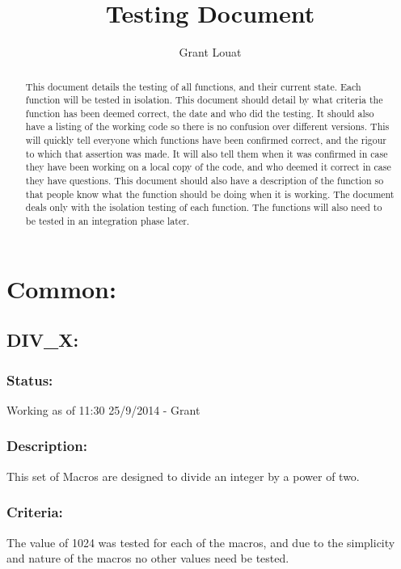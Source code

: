\documentclass[]{article}
\title{Testing Document}
\author{Grant Louat}
\begin{document}
\maketitle

\begin{abstract}
This document details the testing of all functions, and their current state. Each function will be tested in isolation. This document should detail by what criteria the function has been deemed correct, the date and who did the testing. It should also have a listing of the working code so there is no confusion over different versions. This will quickly tell everyone which functions have been confirmed correct, and the rigour to which that assertion was made. It will also tell them when it was confirmed in case they have been working on a local copy of the code, and who deemed it correct in case they have questions. This document should also have a description of the function so that people know what the function should be doing when it is working.\newline
The document deals only with the isolation testing of each function. The functions will also need to be tested in an integration phase later.
\end{abstract}

\section{Common:}

\subsection{DIV\_X:}
\subsubsection{Status:}
Working as of 11:30 25/9/2014 - Grant

\subsubsection{Description:}
This set of Macros are designed to divide an integer by a power of two.

\subsubsection{Criteria:}
The value of 1024 was tested for each of the macros, and due to the simplicity and nature of the macros no other values need be tested.
\end{document}
